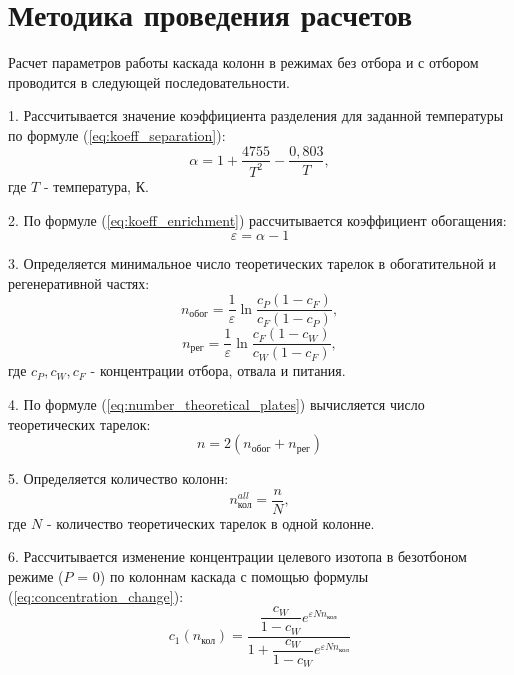 \section{Методика проведения расчетов}
Расчет параметров работы каскада колонн в режимах без отбора и с отбором 
проводится в следующей последовательности.

1. Рассчитывается значение коэффициента разделения для заданной 
температуры по формуле (\ref{eq:koeff_separation}):
\begin{equation}\label{eq:koeff_separation}
\alpha = 1 + \dfrac{4755}{T^{2}} - \dfrac{0,803}{T},
\end{equation}
\noindent где $T$ - температура, К.

2. По формуле (\ref{eq:koeff_enrichment}) рассчитывается коэффициент обогащения:
\begin{equation}\label{eq:koeff_enrichment}
\varepsilon = \alpha - 1
\end{equation}

3. Определяется минимальное число теоретических тарелок в обогатительной 
и регенеративной частях:
\begin{equation}
n_{\text{обог}} = \dfrac{1}{\varepsilon}\ln\dfrac{c_{P}(1-c_{F})}{c_{F}(1-c_{P})},
\end{equation}
\begin{equation}
    n_{\text{рег}} = \dfrac{1}{\varepsilon}\ln\dfrac{c_{F}(1-c_{W})}{c_{W}(1-c_{F})},
    \end{equation}
\noindent где $c_{P}, c_{W}, c_{F}$ - концентрации отбора, отвала и питания.

4. По формуле (\ref{eq:number_theoretical_plates}) вычисляется число 
теоретических тарелок:
\begin{equation}\label{eq:number_theoretical_plates}
n = 2(n_{\text{обог}} + n_{\text{рег}})
\end{equation}

5. Определяется количество колонн:
\begin{equation}
n_{\text{кол}}^{all} = \dfrac{n}{N},
\end{equation}
\noindent где $N$ - количество теоретических тарелок в одной колонне.

6. Рассчитывается изменение концентрации целевого изотопа в безотбоном 
режиме ($P$ = 0) по колоннам каскада с помощью формулы (\ref{eq:concentration_change}):
\begin{equation}\label{eq:concentration_change}
c_{1}(n_{\text{кол}}) = \dfrac{\dfrac{c_{W}}{1-c_{W}}e^{\varepsilon Nn_{\text{кол}}}}{1 + \dfrac{c_{W}}{1-c_{W}}e^{\varepsilon Nn_{\text{кол}}}}
\end{equation}


